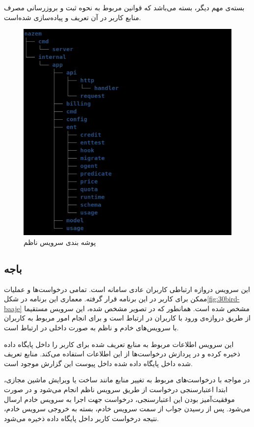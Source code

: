 بسته‌ی مهم دیگر، بسته  می‌باشد که قوانین مربوط به نحوه ثبت و بروزرسانی مصرف منابع کاربر در آن تعریف و پیاده‌سازی شده‌است.

\begin{figure}
	\vspace{1cm}
	\centering
	\includegraphics[scale=0.8]{figures/nazem-dir.png}
	\caption{پوشه بندی سرویس ناظم}
	\label{fig:30bird-nazem-dir}
\end{figure}


\subsection{باجه}
این سرویس دروازه ارتباطی کاربران عادی سامانه است. تمامی درخواست‌ها و عملیات ممکن برای کاربر در این برنامه قرار گرفته. معماری این برنامه در شکل\ref{fig:30bird-baaje} مشخص شده است. همانطور که در تصویر مشخص شده، این سرویس مستقیما از طریق ‌دروازه‌ی ورود با کاربران در ارتباط است و برای انجام امور مربوط به کاربران با سرویس‌های خادم و ناظم به صورت داخلی در ارتباط است.


این سرویس اطلاعات مربوط به منابع تعریف شده برای کاربر را داخل پایگاه داده ذخیره کرده و در پردازش درخواست‌ها از این اطلاعات استفاده می‌کند. منابع تعریف شده داخل پایگاه داده شده داخل پیوست این گزارش موجود است.

در مواجه با درخواست‌های مربوط به تغییر منابع مانند ساخت یا ویرایش ماشین مجازی، ابتدا اعتبارسنجی درخواست از طریق سرویس ناظم انجام می‌شود و در صورت موفقیت‌آمیز بودن این اعتبارسنجی، درخواست جهت اجرا به سرویس خادم ارسال می‌شود. پس از رسیدن جواب از سمت سرویس خادم، بسته به خروجی سرویس خادم، نتیجه درخواست کاربر داخل پایگاه داده ذخیره می‌شود.

